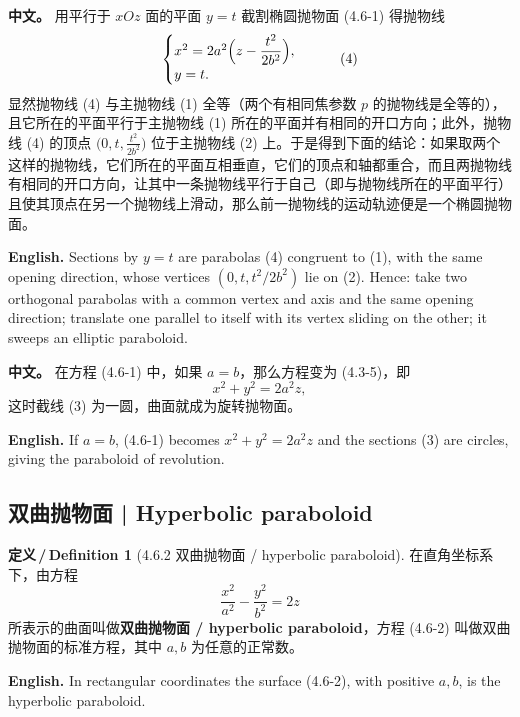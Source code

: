 \documentclass[UTF8,11pt,a4paper]{ctexart}
\newcommand{\APS}[2]{\par\noindent\textbf{中文。} #1\par\noindent\textbf{English.} #2\par\smallskip}
\newcommand{\EN}[1]{\par\noindent \textbf{English.} #1\par}
\theoremstyle{definition}
\newtheorem*{definition}{定义\,/\,Definition}
\begin{document}
\APS{用平行于 $xOz$ 面的平面 $y=t$ 截割椭圆抛物面 (4.6-1) 得抛物线
\[
\begin{cases}x^2=2a^2\Bigl(z-\dfrac{t^2}{2b^2}\Bigr),\\ y=t.\end{cases}\tag{4}
\]
显然抛物线 (4) 与主抛物线 (1) 全等（两个有相同焦参数 $p$ 的抛物线是全等的），且它所在的平面平行于主抛物线 (1) 所在的平面并有相同的开口方向；此外，抛物线 (4) 的顶点 $\bigl(0,t,\frac{t^2}{2b^2}\bigr)$ 位于主抛物线 (2) 上。于是得到下面的结论：如果取两个这样的抛物线，它们所在的平面互相垂直，它们的顶点和轴都重合，而且两抛物线有相同的开口方向，让其中一条抛物线平行于自己（即与抛物线所在的平面平行）且使其顶点在另一个抛物线上滑动，那么前一抛物线的运动轨迹便是一个椭圆抛物面。}{Sections by $y=t$ are parabolas (4) congruent to (1), with the same opening direction, whose vertices $(0,t,t^2/2b^2)$ lie on (2). Hence: take two orthogonal parabolas with a common vertex and axis and the same opening direction; translate one parallel to itself with its vertex sliding on the other; it sweeps an elliptic paraboloid.}

\APS{在方程 (4.6-1) 中，如果 $a=b$，那么方程变为 (4.3-5)，即
\[
x^2+y^2=2a^2z,
\]
这时截线 (3) 为一圆，曲面就成为旋转抛物面。}{If $a=b$, (4.6-1) becomes $x^2+y^2=2a^2z$ and the sections (3) are circles, giving the paraboloid of revolution.}

\subsection{双曲抛物面 | Hyperbolic paraboloid}
\begin{definition}[4.6.2 双曲抛物面 / hyperbolic paraboloid]\label{def:hyp-parab}
在直角坐标系下，由方程
\[
\frac{x^2}{a^2}-\frac{y^2}{b^2}=2z\tag{4.6-2}
\]
所表示的曲面叫做\textbf{双曲抛物面 / hyperbolic paraboloid}，方程 (4.6-2) 叫做双曲抛物面的标准方程，其中 $a,b$ 为任意的正常数。
\EN{In rectangular coordinates the surface (4.6-2), with positive $a,b$, is the hyperbolic paraboloid.}
\end{definition}
\end{document}
